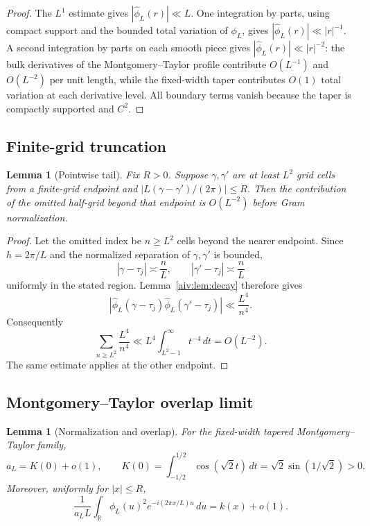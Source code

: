 \documentclass[11pt]{article}
\newtheorem{lemma}[theorem]{Lemma}
\newcommand{\R}{\mathbb R}
\begin{document}
\begin{proof}
The $L^1$ estimate gives $|\widehat\phi_L(r)|\ll L$.
One integration by parts, using compact support and the bounded total
variation of $\phi_L$, gives $|\widehat\phi_L(r)|\ll |r|^{-1}$.
A second integration by parts on each smooth piece gives
$|\widehat\phi_L(r)|\ll |r|^{-2}$: the bulk derivatives of the
Montgomery--Taylor profile contribute $O(L^{-1})$ and $O(L^{-2})$ per unit
length, while the fixed-width taper contributes $O(1)$ total variation at
each derivative level.  All boundary terms vanish because the taper is compactly supported and $C^2$.
\end{proof}

\subsection{Finite-grid truncation}

\begin{lemma}[Pointwise tail]\label{aiv:lem:tail}
Fix $R>0$.  Suppose $\gamma,\gamma'$ are at least $L^2$ grid cells from a
finite-grid endpoint and $|L(\gamma-\gamma')/(2\pi)|\le R$.  Then the
contribution of the omitted half-grid beyond that endpoint is $O(L^{-2})$
before Gram normalization.
\end{lemma}

\begin{proof}
Let the omitted index be $n\ge L^2$ cells beyond the nearer endpoint.  Since
$h=2\pi/L$ and the normalized separation of $\gamma,\gamma'$ is bounded,
\[
 |\gamma-\tau_j|\asymp \frac nL,\qquad
 |\gamma'-\tau_j|\asymp \frac nL
\]
uniformly in the stated region.  Lemma~\ref{aiv:lem:decay} therefore gives
\[
 |\widehat\phi_L(\gamma-\tau_j)
   \widehat\phi_L(\gamma'-\tau_j)|
 \ll \frac{L^4}{n^4}.
\]
Consequently
\[
 \sum_{n\ge L^2}\frac{L^4}{n^4}
 \ll L^4\int_{L^2-1}^{\infty}t^{-4}\,dt
 =O(L^{-2}).
\]
The same estimate applies at the other endpoint.
\end{proof}

\subsection{Montgomery--Taylor overlap limit}

\begin{lemma}[Normalization and overlap]\label{aiv:lem:overlap}
For the fixed-width tapered Montgomery--Taylor family,
\[
 a_L=K(0)+o(1),
 \qquad
 K(0)=\int_{-1/2}^{1/2}\cos(\sqrt2 t)\,dt
 =\sqrt2\sin(1/\sqrt2)>0.
\]
Moreover, uniformly for $|x|\le R$,
\[
 \frac1{a_LL}
 \int_{\R}\phi_L(u)^2e^{-i(2\pi x/L)u}\,du
 =
 k(x)+o(1).
\]
\end{lemma}
\end{document}
